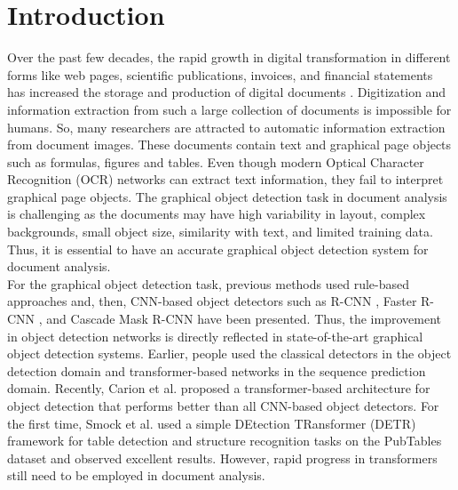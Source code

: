 \documentclass[sn-mathphys]{sn-jnl}\jyear{2021}\theoremstyle{thmstyleone}\newtheorem{theorem}{Theorem}\newtheorem{proposition}[theorem]{Proposition}\theoremstyle{thmstyletwo}\newtheorem{example}{Example}\newtheorem{remark}{Remark}\theoremstyle{thmstylethree}\newtheorem{definition}{Definition}\usepackage{amsmath}
\begin{document}





\maketitle

\section{Introduction}
\label{sec:introduction}
Over the past few decades, the rapid growth in digital transformation in different forms like web pages, scientific publications, invoices, and financial statements has increased the storage and production of digital documents \cite{digital10}. Digitization and information extraction from such a large collection of documents is impossible for humans. So, many researchers are attracted to automatic information extraction from document images. These documents contain text and graphical page objects such as formulas, figures and tables. Even though modern Optical Character Recognition (OCR)  networks \cite{ocr8, ocr50, ocr45} can extract text information, they fail to interpret graphical page objects. The graphical object detection task in document analysis is challenging as the documents may have high variability in layout, complex backgrounds, small object size, similarity with text, and limited training data. Thus, it is essential to have an accurate graphical object detection system for document analysis.\\

For the graphical object detection task, previous methods used rule-based approaches \cite{Anh56, Gatos876, Harit89, Yalin78} and, then, CNN-based object detectors such as R-CNN \cite{Yi77, Oliveira565}, Faster R- CNN \cite{FasterTD}, and Cascade Mask R-CNN \cite{Agarwal52} have been presented. Thus, the improvement in object detection networks is directly reflected in state-of-the-art graphical object detection systems.  Earlier, people used the classical detectors in the object detection domain and transformer-based networks in the sequence prediction domain. Recently, Carion et al. \cite{att75} proposed a transformer-based architecture for object detection that performs better than all CNN-based object detectors. For the first time, Smock et al. \cite {pubtables5} used a simple DEtection TRansformer (DETR) framework for table detection and structure recognition tasks on the PubTables \cite{pubtables5} dataset and observed excellent results. However, rapid progress in transformers still need to be employed in document analysis. \\
\end{document}
